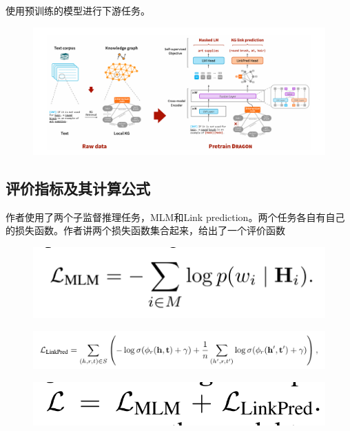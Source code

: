 使用预训练的模型进行下游任务。
\begin{figure}[H]
  \centering
  \includegraphics[width=\textwidth]{figure/1.png}
  \caption{}
  \label{fig:my_label}
\end{figure}

\subsection{评价指标及其计算公式}
作者使用了两个子监督推理任务，MLM和Link prediction。两个任务各自有自己的损失函数。作者讲两个损失函数集合起来，给出了一个评价函数
\begin{figure}[H]
  \centering
  \includegraphics[width=\textwidth]{figure/2.png}
  \caption{}
  \label{fig:my_label}
\end{figure}
\begin{figure}[H]
  \centering
  \includegraphics[width=\textwidth]{figure/3.png}
  \caption{}
  \label{fig:my_label}
\end{figure}
\begin{figure}[H]
  \centering
  \includegraphics[width=\textwidth]{figure/4.png}
  \caption{}
  \label{fig:my_label}
\end{figure}


